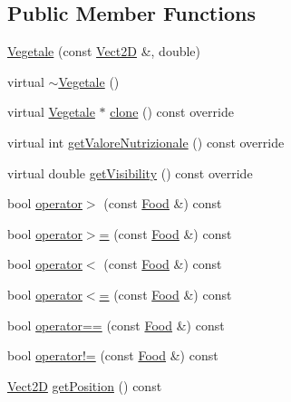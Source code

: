 \subsection*{Public Member Functions}
\begin{DoxyCompactItemize}
\item 
\hyperlink{classVegetale_ac3e8834cbccca2daa020e8df67ba70a4_ac3e8834cbccca2daa020e8df67ba70a4}{Vegetale} (const \hyperlink{classVect2D}{Vect2D} \&, double)
\item 
virtual \hyperlink{classVegetale_a6b793a68f74a30eef795b1c5458140a0_a6b793a68f74a30eef795b1c5458140a0}{$\sim$\+Vegetale} ()
\item 
virtual \hyperlink{classVegetale}{Vegetale} $\ast$ \hyperlink{classVegetale_a969a0aae9c47a8dbb6acb3080fb98984_a969a0aae9c47a8dbb6acb3080fb98984}{clone} () const override
\item 
virtual int \hyperlink{classVegetale_a6f174aa44bf87ea44f3737390f1e6490_a6f174aa44bf87ea44f3737390f1e6490}{get\+Valore\+Nutrizionale} () const override
\item 
virtual double \hyperlink{classVegetale_a4e4528535441df5619648d279ad81306_a4e4528535441df5619648d279ad81306}{get\+Visibility} () const override
\item 
bool \hyperlink{classFood_a63e0188fe0464bc533d800d8cdb17984_a63e0188fe0464bc533d800d8cdb17984}{operator$>$} (const \hyperlink{classFood}{Food} \&) const
\item 
bool \hyperlink{classFood_a8f2ac4d8b5434d35947b038390fab95d_a8f2ac4d8b5434d35947b038390fab95d}{operator$>$=} (const \hyperlink{classFood}{Food} \&) const
\item 
bool \hyperlink{classFood_ac0c1ef5c9608080ae7e0bbb6375f92ce_ac0c1ef5c9608080ae7e0bbb6375f92ce}{operator$<$} (const \hyperlink{classFood}{Food} \&) const
\item 
bool \hyperlink{classFood_a69f902e1e0268b3ad9d99f7a46ab3ae5_a69f902e1e0268b3ad9d99f7a46ab3ae5}{operator$<$=} (const \hyperlink{classFood}{Food} \&) const
\item 
bool \hyperlink{classFood_afaba8cd54420aecea26a207f0fd0251a_afaba8cd54420aecea26a207f0fd0251a}{operator==} (const \hyperlink{classFood}{Food} \&) const
\item 
bool \hyperlink{classFood_abf50e88ce6cc0db8c43dfb42d2978b01_abf50e88ce6cc0db8c43dfb42d2978b01}{operator!=} (const \hyperlink{classFood}{Food} \&) const
\item 
\hyperlink{classVect2D}{Vect2D} \hyperlink{classCartesianObject2D_aa3a6b63777852ab9eb9408ed2536abe2_aa3a6b63777852ab9eb9408ed2536abe2}{get\+Position} () const
\end{DoxyCompactItemize}

